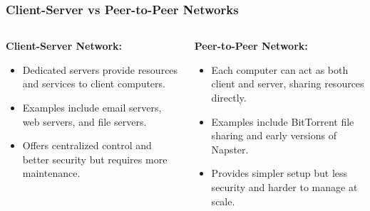 \documentclass{beamer}
\begin{document}
\begin{frame}
    \frametitle{Client-Server vs Peer-to-Peer Networks}
    
    \begin{columns}[t]
        \begin{column}{0.5\textwidth}
            \textbf{Client-Server Network:}
            \begin{itemize}
                \item Dedicated servers provide resources and services to client computers.
                
                \item Examples include email servers, web servers, and file servers.
                
                \item Offers centralized control and better security but requires more maintenance.
            \end{itemize}
        \end{column}
        
        \begin{column}{0.5\textwidth}
            \textbf{Peer-to-Peer Network:}
            \begin{itemize}
                \item Each computer can act as both client and server, sharing resources directly.
                
                \item Examples include BitTorrent file sharing and early versions of Napster.
                
                \item Provides simpler setup but less security and harder to manage at scale.
            \end{itemize}
        \end{column}
    \end{columns}
\end{frame}
\end{document}

